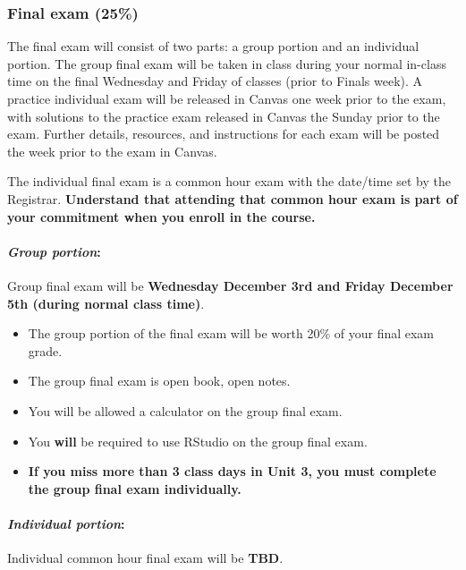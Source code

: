 \documentclass[
]{article}
\providecommand{\tightlist}{%
  \setlength{\itemsep}{0pt}\setlength{\parskip}{0pt}}
\begin{document}
\subsubsection{Final exam (25\%)}\label{final-exam-25}

The final exam will consist of two parts: a group portion and an
individual portion. The group final exam will be taken in class during
your normal in-class time on the final Wednesday and Friday of classes
(prior to Finals week). A practice individual exam will be released in
Canvas one week prior to the exam, with solutions to the practice exam
released in Canvas the Sunday prior to the exam. Further details,
resources, and instructions for each exam will be posted the week prior
to the exam in Canvas.

The individual final exam is a common hour exam with the date/time set
by the Registrar. \textbf{Understand that attending that common hour
exam is part of your commitment when you enroll in the course.}

\paragraph{\texorpdfstring{\emph{Group
portion}:}{Group portion:}}\label{group-portion-1}

Group final exam will be \textbf{Wednesday December 3rd and Friday
December 5th (during normal class time)}.

\begin{itemize}
\tightlist
\item
  The group portion of the final exam will be worth 20\% of your final
  exam grade.
\item
  The group final exam is open book, open notes.
\item
  You will be allowed a calculator on the group final exam.
\item
  You \textbf{will} be required to use RStudio on the group final exam.
\item
  \textbf{If you miss more than 3 class days in Unit 3, you must
  complete the group final exam individually.}
\end{itemize}

\paragraph{\texorpdfstring{\emph{Individual
portion}:}{Individual portion:}}\label{individual-portion-1}

Individual common hour final exam will be \textbf{TBD}.
\end{document}
